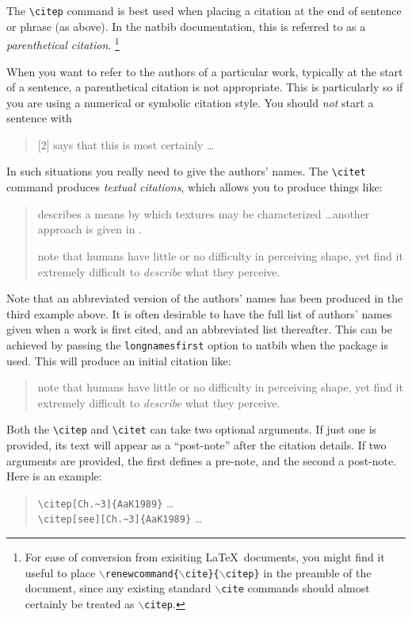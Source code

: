 \documentclass[a4paper,11pt]{article}
\begin{document}
The \verb+\citep+ command is best used when placing a citation at the end
of sentence or phrase (as above).  In the {\sf natbib} documentation, this
is referred to as a \emph{parenthetical citation}.%
\footnote{For ease of conversion from exisiting \LaTeX\ documents, you
might find it useful to place
\texttt{$\backslash$renewcommand\{$\backslash$cite\}\{$\backslash$citep\}}
in the preamble of the document, since any existing standard
\texttt{$\backslash$cite} commands should almost certainly be treated as
\texttt{$\backslash$citep}.}

When you want to refer to the authors of a particular work, typically at
the start of a sentence, a parenthetical citation is not appropriate. This
is particularly so if you are using a numerical or symbolic citation style.
You should \emph{not} start a sentence with
\begin{quote}
[2] says that this is most certainly \ldots
\end{quote}
In such situations you really need to give the authors' names. The
\verb+\citet+ command produces \emph{textual citations}, which allows you
to produce things like:
\begin{quote}
\citet{Ade1983} describes a means by which textures may be
characterized \ldots another approach is given in \citet{DeV1998}.

\citet{AGR1996} note that humans have little or no difficulty in
perceiving shape, yet find it extremely difficult to \emph{describe} what
they perceive.
\end{quote}

Note that an abbreviated version of the authors' names has been produced in
the third example above.  It is often desirable to have the full list of
authors' names given when a work  is first cited, and an abbreviated list
thereafter. This can be achieved by passing the \texttt{longnamesfirst}
option to {\sf natbib} when the package is used. This will produce
an initial citation like:
\begin{quote}
\citet*{AGR1996} note that humans have little or no difficulty in
perceiving shape, yet find it extremely difficult to \emph{describe} what
they perceive.
\end{quote}

Both the \verb+\citep+ and \verb+\citet+ can take two optional arguments.
If just one is provided,  its text will appear as a ``post-note'' after the
citation details. If two arguments are provided, the first defines a
pre-note, and the second a post-note. Here is an example:
\begin{quote}
\verb+\citep[Ch.~3]{AaK1989}+ \ldots{} \citep[Ch.~3]{AaK1989}\\
\verb+\citep[see][Ch.~3]{AaK1989}+ \ldots{} \citep[see][Ch.~3]{AaK1989}\\
\end{quote}
\end{document}
